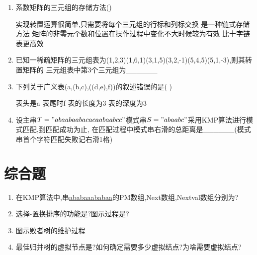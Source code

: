 \documentclass[12pt, a4paper, oneside, UTF8]{ctexbook}
\begin{document}
\begin{enumerate}
    \item 系数矩阵的三元组的存储方法()
    \begin{choices}[1]
        \task 实现转置运算很简单,只需要将每个三元组的行标和列标交换
        \task 是一种链式存储方法
        \task 矩阵的非零元个数和位置在操作过程中变化不大时候较为有效
        \task 比十字链表更高效
    \end{choices}

    \item 已知一稀疏矩阵的三元组表为(1,2,3)(1,6,1)(3,1,5)(3,2,-1)(5,4,5)(5,1,-3),则其转置矩阵的
    三元组表中第3个三元组为\_\_\_\_\_\_

    \item 下列关于广义表(a,(b,c),((d,e),f))的叙述错误的是(   ) 
    \begin{choices}
        \task 表头是a \task 表尾时f \task 表的长度为3 \task 表的深度为3
    \end{choices}

    \item 设主串$T="abaabaabacacaabaabcc"$模式串$S="abaabc"$采用KMP算法进行模式匹配,到匹配成功为止,
    在匹配过程中模式串右滑的总距离是\_\_\_\_\_\_(模式串首个字符匹配失败记右滑1格)
\end{enumerate}
\newpage
\section{综合题}

\begin{enumerate}
    \item \bt 在KMP算法中,串\underline{ababaaababaa}的PM数组,Next数组,Nextval数组分别为? 
    \item 选择-置换排序的功能是?图示过程是? 
    \item 图示败者树的维护过程 
    \item 最佳归并树的虚拟节点是?如何确定需要多少虚拟结点?为啥需要虚拟结点?
\end{enumerate}
\newpage
\end{document}
